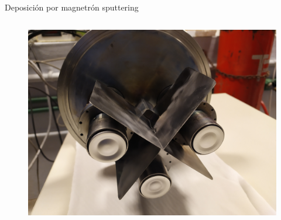 \documentclass[11pt]{beamer}
\begin{document}
\begin{frame}{Deposición por magnetrón sputtering}
\begin{columns}[T]
\begin{column}{.58\textwidth}
\begin{figure}[H]
					\includegraphics[scale=0.04]{img/magnetrones.jpg}
					\end{figure}
				\end{column}
			\end{columns}
		\end{frame}
		
\end{document}
